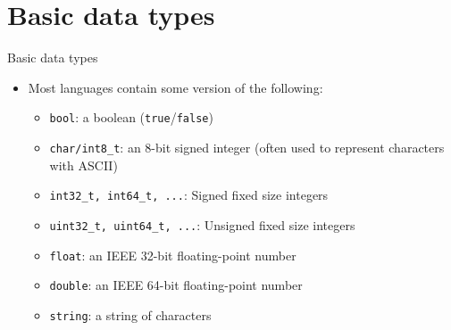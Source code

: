 \documentclass{beamer}
\begin{document}
\section*{Basic data types}

\begin{frame}[plain]{Basic data types}
    \begin{itemize}
        \vspace{20pt}

        \item Most languages contain some version of the following:

        \begin{itemize}
            \item \texttt{bool}: a boolean (\texttt{true}/\texttt{false})
            \vspace{5pt}
            \item \texttt{char/int8\_t}: an 8-bit signed integer (often used to represent characters with ASCII)
            \item \texttt{int32\_t, int64\_t, ...}: Signed fixed size integers
            \item \texttt{uint32\_t, uint64\_t, ...}: Unsigned fixed size integers
            \vspace{5pt}
            \item \texttt{float}: an IEEE 32-bit floating-point number
            \item \texttt{double}: an IEEE 64-bit floating-point number
            \vspace{5pt}
            \item \texttt{string}: a string of characters
        \end{itemize}
    \end{itemize}
\end{frame}
\end{document}

